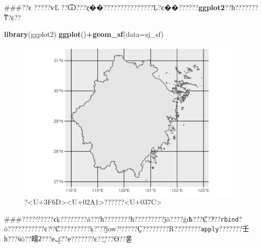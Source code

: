\documentclass[]{article}
\newenvironment{Shaded}{\begin{snugshade}}{\end{snugshade}}
\newcommand{\DataTypeTok}[1]{\textcolor[rgb]{0.13,0.29,0.53}{#1}}
\newcommand{\KeywordTok}[1]{\textcolor[rgb]{0.13,0.29,0.53}{\textbf{#1}}}
\newcommand{\NormalTok}[1]{#1}
\newcommand{\OperatorTok}[1]{\textcolor[rgb]{0.81,0.36,0.00}{\textbf{#1}}}
\begin{document}
\#\#\#??ͼ
?????ѵĽ׶??Ѿ???ȥ��???????????????Ļ?ͼ��??????\textbf{ggplot2}??һ???????ͳ?ͼ??

\begin{Shaded}
\begin{Highlighting}[]
\KeywordTok{library}\NormalTok{(ggplot2)}
\KeywordTok{ggplot}\NormalTok{()}\OperatorTok{+}\KeywordTok{geom_sf}\NormalTok{(}\DataTypeTok{data=}\NormalTok{zj_sf)}
\end{Highlighting}
\end{Shaded}

\begin{figure}

{\centering \includegraphics{利用高德地图_files/figure-latex/ggplot_zj-1} 

}

\caption{?<U+3F6D><U+02A1>??????<U+037C>}\label{fig:ggplot_zj}
\end{figure}

\#\#\#????
ͨ?????ϵķ????????ǿ???һ????????һ?????????ĵõ????ǵı߿???Ȼ??ͨ??\texttt{rbind}?õ???????????ͼ?ˡ?Ȼ?????????ķ?ʽ??̫low?ˡ?????Ҫ????????R????????\texttt{apply}???????壬һ???ӵõ??㽭ʡ???еؼ??е???????ͼ??ֱ???ϴ??롣
\end{document}

